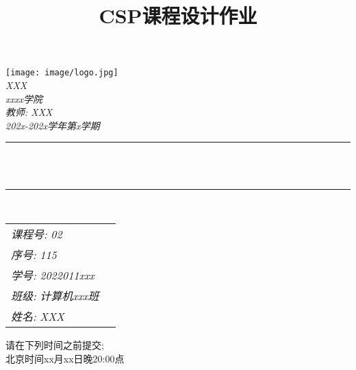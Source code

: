 \documentclass[cn,11pt,chinese]{elegantbook}
\begin{document}
\title{CSP课程设计作业}
\begin{titlepage}
	\newcommand{\HRule}{\rule{\linewidth}{0.5mm}}
    \texttt{[image: image/logo.jpg]}
	\center 
	\quad\\[1.5cm]
	\textsl{\Large XXX}\\[0.5cm] 
	\textsl{\large xxxx学院}\\[0.5cm] 
      \textsl{\large 教师:  XXX}\\[0.5cm] 
     \textsl{\large 202x-202x学年第x学期 }\\[0.5cm]  
 \makeatletter
	\HRule \\[0.4cm]
	{ \huge \bfseries \@title}\\[0.4cm] 
	\HRule \\[1.5cm]
    \renewcommand\arraystretch{1.6}{\begin{tabular}{ll}
     
      \textsl{课程号:} \textsl{02}  \\
        \textsl{序号:} \textsl{115} 
        \\
        \textsl{学号:} \textsl{2022011xxx}\\ 
        \textsl{班级:}\textsl{ 计算机xxx班}\\
        \textsl{姓名:}  \textsl{XXX}  
    \end{tabular}}
     \vfill
	\makeatother
	{\large 请在下列时间之前提交;}\\[0.5cm]
	{\large{北京时间xx月xx日晚20:00点}}\\[2cm] 
	\vfill 

 \newpage



\end{titlepage}
\end{document}
